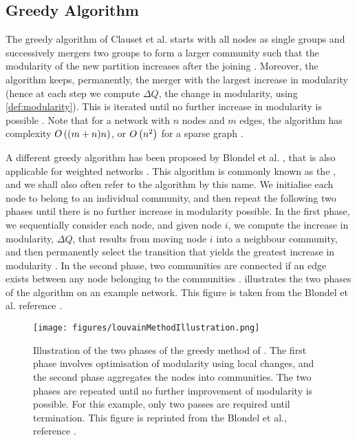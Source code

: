 
\subsection{Greedy Algorithm}
\label{subsec:greedyAlgorithm}

The greedy algorithm of Clauset et al. \cite{CNM04} starts with all nodes as single groups and successively mergers two groups to form a larger community such that the modularity of the new partition increases after the joining \cite{CNM04,For10}.
Moreover, the algorithm keeps, permanently, the merger with the largest increase in modularity (hence at each step we compute $\Delta Q$, the change in modularity, using \cref{def:modularity}).
This is iterated until no further increase in modularity is possible \cite{CNM04}.
Note that for a network with $n$ nodes and $m$ edges, the algorithm has complexity $O\left((m+n)n\right)$, or $O\left(n^{2}\right)$ for a sparse graph \cite{For10}.

A different greedy algorithm has been proposed by Blondel et al. \cite{BGL+08}, that is also applicable for weighted networks \cite{For10}.
This algorithm is commonly known as the , and we shall also often refer to the algorithm by this name.
We initialise each node to belong to an individual community, and then repeat the following two phases until there is no further increase in modularity possible.
In the first phase, we sequentially consider each node, and given node $i$, we compute the increase in modularity, $\Delta Q$, that results from moving node $i$ into a neighbour community, and then permanently select the transition that yields the greatest increase in modularity \cite{BGL+08,For10}.
In the second phase, two communities are connected if an edge exists between any node belonging to the communities \cite{BGL+08,For10}.
 illustrates the two phases of the algorithm on an example network. This figure is taken from the Blondel et al. reference \cite{BGL+08}.

\begin{figure}
	\centering
	\texttt{[image: figures/louvainMethodIllustration.png]}
	\caption[Illustration of greedy algorithm for modularity optimisation.]{\label{fig:LouvainMethodIllustration} Illustration of the two phases of the greedy method of \cite{BGL+08}. The first phase involves optimisation of modularity using local changes, and the second phase aggregates the nodes into communities. The two phases are repeated until no further improvement of modularity is possible. For this example, only two passes are required until termination. This figure is reprinted from the Blondel et al., reference \cite{BGL+08}.}
\end{figure}

